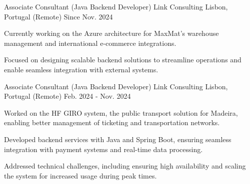 


\begin{cventries}


  \cventry
  {Associate Consultant (Java Backend Developer)} %
  {Link Consulting} %
  {Lisbon, Portugal (Remote)} %
  {Since Nov. 2024} %
  { %
    \begin{cvitems}
      \item {Currently working on the Azure architecture for MaxMat's warehouse management and international e-commerce integrations.}
      \item {Focused on designing scalable backend solutions to streamline operations and enable seamless integration with external systems.}
    \end{cvitems}
  }

  \vspace{0.4cm}


  \cventry
  {Associate Consultant (Java Backend Developer)} %
  {Link Consulting} %
  {Lisbon, Portugal (Remote)} %
  {Feb. 2024 - Nov. 2024} %
  { %
    \begin{cvitems}
      \item {Worked on the HF GIRO system, the public transport solution for Madeira, enabling better management of ticketing and transportation networks.}
      \item {Developed backend services with Java and Spring Boot, ensuring seamless integration with payment systems and real-time data processing.}
      \item {Addressed technical challenges, including ensuring high availability and scaling the system for increased usage during peak times.}
    \end{cvitems}
  }


\end{cventries}
